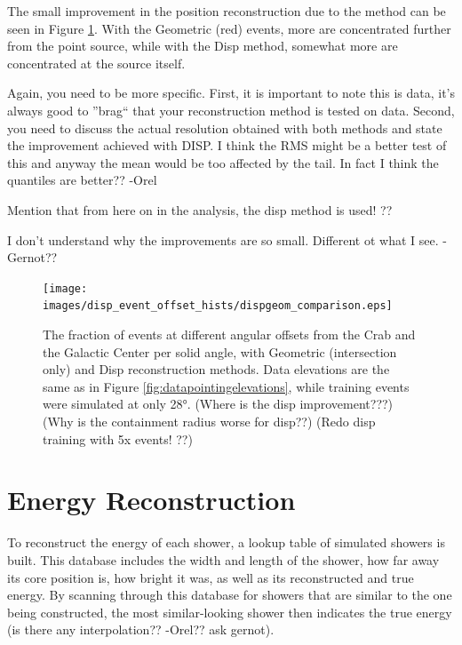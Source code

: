     The small improvement in the position reconstruction due to the \disp{} method can be seen in Figure \ref{fig:disp_event_offset}.
    With the Geometric (red) events, more are concentrated further from the point source, while with the Disp method, somewhat more are concentrated at the source itself.
    
    {\color{red}Again, you need to be more specific. First, it is important to note this is data, it's always good to ''brag`` that your reconstruction method is tested on data.  Second, you need to discuss the actual resolution obtained with both methods and state the improvement achieved with DISP. I think the RMS might be a better test of this and anyway the mean would be too affected by the tail. In fact I think the quantiles are better?? -Orel}
    
    {\color{red} Mention that from here on in the analysis, the disp method is used! ??}
  
    {\color{red}I don't understand why the improvements are so small.  Different ot what I see. -Gernot?? }

    \begin{figure}[ht]
      \centering
      \texttt{[image: images/disp\_event\_offset\_hists/dispgeom\_comparison.eps]}
      \caption[DISP Offset Improvement]{
        The fraction of events at different angular offsets from the Crab and the Galactic Center per solid angle, with Geometric (intersection only) and Disp reconstruction methods.
        Data elevations are the same as in Figure \ref{fig:datapointingelevations}, while training events were simulated at only \ang{28}.
        {\color{red}(Where is the disp improvement???)}
        {\color{red}(Why is the containment radius worse for disp??)}
        {\color{red}(Redo disp training with 5x events! ??)}
      }
      \label{fig:disp_event_offset}
    \end{figure}
  
  \FloatBarrier

\section{Energy Reconstruction}\label{subsec:enrecon}
  To reconstruct the energy of each shower, a lookup table of simulated showers is built.
This database includes the width and length of the shower, how far away its core position is, how bright it was, as well as its reconstructed and true energy.
  By scanning through this database for showers that are similar to the one being constructed, the most similar-looking shower then indicates the true energy {\color{red} (is there any interpolation?? -Orel?? ask gernot)}.


